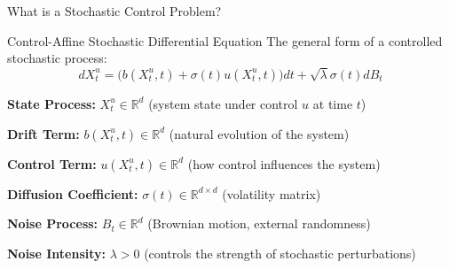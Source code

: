 \documentclass[aspectratio=169,xcolor=dvipsnames]{beamer}
\begin{document}
\begin{frame}{What is a Stochastic Control Problem?}
    
    \begin{block}{Control-Affine Stochastic Differential Equation}
        The general form of a controlled stochastic process:
        \begin{equation}
        dX_t^u = \big(b(X_t^u, t) + \sigma(t)u(X_t^u, t)\big) dt + \sqrt{\lambda}\sigma(t) dB_t
        \end{equation}
    \end{block}

            \vspace{0.3cm}
    
            \textbf{State Process:} $X_t^u \in \mathbb{R}^d$ (system state under control $u$ at time $t$)
            
            \vspace{0.3cm}
            
            \textbf{Drift Term:} $b(X_t^u, t) \in \mathbb{R}^d$ (natural evolution of the system)
            
            \vspace{0.3cm}
            
            \textbf{Control Term:} $u(X_t^u, t) \in \mathbb{R}^d$ (how control influences the system)
            
            \vspace{0.3cm}
            
            \textbf{Diffusion Coefficient:} $\sigma(t) \in \mathbb{R}^{d \times d}$ (volatility matrix)
            
            \vspace{0.3cm}
            
            \textbf{Noise Process:} $B_t \in \mathbb{R}^d$ (Brownian motion, external randomness)
            
            \vspace{0.3cm}
            
            \textbf{Noise Intensity:} $\lambda > 0$ (controls the strength of stochastic perturbations)


\end{frame}
\end{document}
